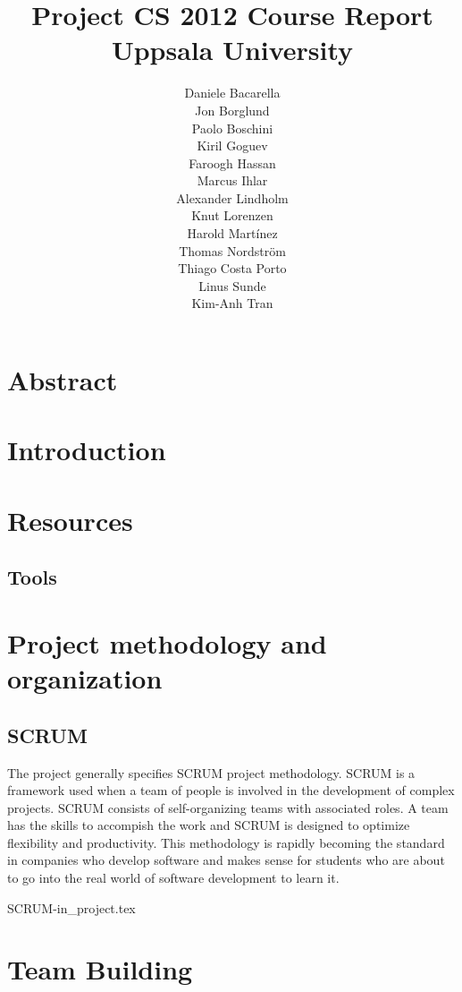\documentclass[11pt]{report}
\title{Project CS 2012 Course Report\\Uppsala University\\}
\author{Daniele Bacarella\\
		Jon Borglund\\
		Paolo Boschini\\
		Kiril Goguev\\
		Faroogh Hassan\\
		Marcus Ihlar\\
		Alexander Lindholm\\
		Knut Lorenzen\\
		Harold Mart\'{i}nez\\
		Thomas Nordstr\"om\\
		Thiago Costa Porto\\
		Linus Sunde\\
		Kim-Anh Tran
}
\date{}
\begin{document}
\maketitle

\tableofcontents

\chapter{Abstract}


\chapter{Introduction}

\chapter{Resources}





\section{Tools}




\chapter{Project methodology and organization}
\section{SCRUM}

The project generally specifies SCRUM project methodology. SCRUM is a framework used when a team of people is involved in the development of complex projects. SCRUM consists of self-organizing teams with associated roles. A team has the skills to accompish the work and SCRUM is designed to optimize flexibility and productivity. This methodology is rapidly becoming the standard in companies who develop software and makes sense for students who are about to go into the real world of software development to learn it. 






 {SCRUM-in_project.tex}


\chapter{Team Building}

\end{document}

